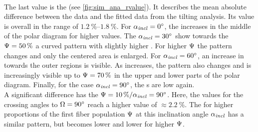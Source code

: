 \paragraph{\rvalue}
The last value is the \rvalue{} (see \cref{fig:sim_ana_rvalue}).
It describes the mean absolute difference between the data and the fitted data from the tilting analysis.
Its value is overall in the range of $\SIrange{1.2}{1.8}{\percent}$.
For $\textnormal{$\alpha_{\mathit{incl}}$} = \SI{0}{\degree}$, the \rvalue{} increases in the middle of the polar diagram for higher \modelPsi{} values.
The $\textnormal{$\alpha_{\mathit{incl}}$} = \SI{30}{\degree}$ show towards the $\textnormal{$\Psi$} = \SI{50}{\percent}$ a curved pattern with slightly higher \rvalue{}.
For higher $\textnormal{$\Psi$}$ the pattern changes and only the centered area is enlarged.
For $\textnormal{$\alpha_{\mathit{incl}}$} = \SI{60}{\degree}$, an increase in \rvalue{} towards the outer regions is visible.
As \modelInc{} increases, the pattern also changes and is increasingly visible up to $\textnormal{$\Psi$}=\SI{70}{\percent}$ in the upper and lower parts of the polar diagram.
Finally, for the case $\textnormal{$\alpha_{\mathit{incl}}$} = \SI{90}{\degree}$, the \rvalue s are low again.
\\
%
A significant difference has the $\textnormal{$\Psi$} = \SI{10}{\percent} / \textnormal{$\alpha_{\mathit{incl}}$} = \SI{90}{\degree}$.
Here, the values for the crossing angles to $\textnormal{$\Omega$} = \SI{90}{\degree}$ reach a higher value of $\approx \SI{2.2}{\percent}$.
The \rvalue{} for higher proportions of the first fiber population $\textnormal{$\Psi$}$ at this inclination angle $\textnormal{$\alpha_{\mathit{incl}}$}$ has a similar pattern, but becomes lower and lower for higher $\textnormal{$\Psi$}$.
%
%
%
%

